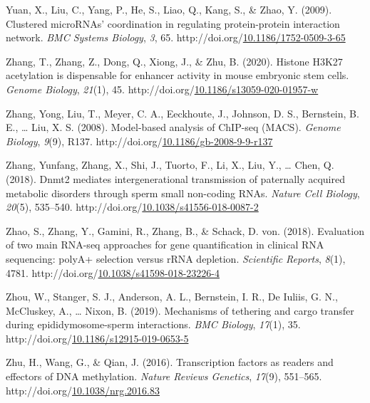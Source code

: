 \documentclass[12pt,twoside]{reedthesis}
\newlength{\cslhangindent}
\newenvironment{CSLReferences}[2] %
 {%
  \setlength{\parindent}{0pt}
  \ifodd #1 \everypar{\setlength{\hangindent}{\cslhangindent}}\ignorespaces\fi
  \ifnum #2 > 0
  \setlength{\parskip}{#2\baselineskip}
  \fi
 }%
 {}
\begin{document}
\begin{CSLReferences}{1}{0}
\leavevmode{}%
Yuan, X., Liu, C., Yang, P., He, S., Liao, Q., Kang, S., \& Zhao, Y. (2009). Clustered microRNAs' coordination in regulating protein-protein interaction network. \emph{BMC Systems Biology}, \emph{3}, 65. http://doi.org/\href{https://doi.org/10.1186/1752-0509-3-65}{10.1186/1752-0509-3-65}

\leavevmode{}%
Zhang, T., Zhang, Z., Dong, Q., Xiong, J., \& Zhu, B. (2020). Histone H3K27 acetylation is dispensable for enhancer activity in mouse embryonic stem cells. \emph{Genome Biology}, \emph{21}(1), 45. http://doi.org/\href{https://doi.org/10.1186/s13059-020-01957-w}{10.1186/s13059-020-01957-w}

\leavevmode{}%
Zhang, Yong, Liu, T., Meyer, C. A., Eeckhoute, J., Johnson, D. S., Bernstein, B. E., \ldots{} Liu, X. S. (2008). Model-based analysis of ChIP-seq (MACS). \emph{Genome Biology}, \emph{9}(9), R137. http://doi.org/\href{https://doi.org/10.1186/gb-2008-9-9-r137}{10.1186/gb-2008-9-9-r137}

\leavevmode{}%
Zhang, Yunfang, Zhang, X., Shi, J., Tuorto, F., Li, X., Liu, Y., \ldots{} Chen, Q. (2018). Dnmt2 mediates intergenerational transmission of paternally acquired metabolic disorders through sperm small non-coding {RNAs}. \emph{Nature Cell Biology}, \emph{20}(5), 535--540. http://doi.org/\href{https://doi.org/10.1038/s41556-018-0087-2}{10.1038/s41556-018-0087-2}

\leavevmode{}%
Zhao, S., Zhang, Y., Gamini, R., Zhang, B., \& Schack, D. von. (2018). Evaluation of two main {RNA}-seq approaches for gene quantification in clinical {RNA} sequencing: {polyA}+ selection versus {rRNA} depletion. \emph{Scientific Reports}, \emph{8}(1), 4781. http://doi.org/\href{https://doi.org/10.1038/s41598-018-23226-4}{10.1038/s41598-018-23226-4}

\leavevmode{}%
Zhou, W., Stanger, S. J., Anderson, A. L., Bernstein, I. R., De Iuliis, G. N., McCluskey, A., \ldots{} Nixon, B. (2019). Mechanisms of tethering and cargo transfer during epididymosome-sperm interactions. \emph{{BMC} Biology}, \emph{17}(1), 35. http://doi.org/\href{https://doi.org/10.1186/s12915-019-0653-5}{10.1186/s12915-019-0653-5}

\leavevmode{}%
Zhu, H., Wang, G., \& Qian, J. (2016). Transcription factors as readers and effectors of DNA methylation. \emph{Nature Reviews Genetics}, \emph{17}(9), 551--565. http://doi.org/\href{https://doi.org/10.1038/nrg.2016.83}{10.1038/nrg.2016.83}


\end{CSLReferences}
\end{document}

